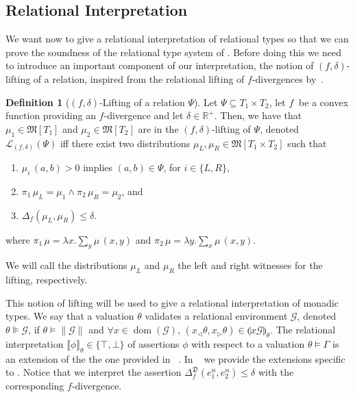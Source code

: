 \documentclass{sig-alternate-05-2015}
\theoremstyle{plain}
\theoremstyle{definition}
\newtheorem{definition}{Definition}[section]
\theoremstyle{corollary}
\def\lvmark{\triangleleft}
\def\rvmark{\triangleright}
\renewcommand{\l}[1]{#1_\lvmark}
\renewcommand{\r}[1]{#1_\rvmark}
\newcommand{\rrembed}[1]{\|{#1}\|}
\newcommand{\rmark}[1]{{#1}^{\Join}}
\newcommand{\renv}[1]{\mathcal{#1}}
\newcommand{\interp}[2]{\llbracket {#2} \rrbracket_{#1}}
\newcommand{\rinterp}[2]{\llparenthesis {#2} \rrparenthesis_{#1}}
\DeclareMathOperator{\dom}{dom}
\newcommand{\tmod}[1]{\mathfrak{M}[{#1}]}
\newcommand{\lift}[2]{\mathcal{L}_{#1}(#2)}
\def\R{\mathbb{R}}
\newcommand{\rplus}{\R^+}
\newcommand{\fdiv}{\ensuremath{f}}
\begin{document}
\subsection{Relational Interpretation}
We want now to give a relational interpretation of relational types so
that we can prove the soundness of the relational type system of \THESYSTEM.
Before doing this we need to introduce an important component of our interpretation, the notion of $(\fdiv,\delta)$-lifting of a relation, inspired from the relational lifting of \fdiv-divergences by~\citet{BartheO13}.


\begin{definition}[$(\fdiv,\delta)$-Lifting of a relation $\Psi$]
\label{def:lifting} Let $\Psi\subseteq T_1\times T_2$, let
  \fdiv$\ $ be a convex function providing an \fdiv-divergence and let 
  $\delta\in\rplus$. Then, we have that $\mu_1\in\tmod{T_1}$ and
  $\mu_2\in\tmod{T_2}$ are in the $(\fdiv, \delta)$-lifting of $\Psi$,
  denoted $\lift{(\fdiv, \delta)}{\Psi}$  iff there exist
  two distributions $\mu_L,\mu_R\in\tmod{T_1\times T_2}$ such that
  \begin{enumerate}
    \item $\mu_i\, (a,b) > 0$ implies $(a,b)\in \Psi$, for $i\in\{L,R\}$,
    \item $\pi_1\, \mu_L =\mu_1\land \pi_2\, \mu_R=\mu_2$, and
    \item $\Delta_{\fdiv}(\mu_L, \mu_R)\leq \delta$.
  \end{enumerate}
where $\pi_1\, \mu = \lambda x. \sum_{y} \mu\, (x,y)$ and $\pi_2\, \mu
= \lambda y. \sum_{x} \mu\, (x,y)$.

We will call the distributions $\mu_L$ and $\mu_R$ the left and right
witnesses for the lifting, respectively.
\end{definition}
This notion of lifting will be used to give a relational interpretation of  monadic types. We say that a valuation $\theta$ validates a relational environment  $\renv{G}$, denoted $\theta \VDash \renv{G}$, if $\theta \vDash
 \rrembed{\renv{G}}$ and $\forall x \in \dom(\renv{G})$,
 $(\l{x}\theta, \r{x}\theta) \in \rinterp{\theta}{x\renv{G}}$.
The relational interpretation $\interp{\theta}{\phi} \in \{ \top, \bot \}$ of 
assertions $\phi$ with respect to a valuation $\theta \vDash \Gamma$ is an extension of the
the one provided in ~\citet{BartheGAHRS15}. In ~ we provide the extensions specific to \THESYSTEM.
Notice that we interpret the assertion $\Delta_\fdiv^\mathfrak{D}(\rmark{e}_1, \rmark{e}_2)\leq \delta$ with the corresponding $\fdiv$-divergence.
\end{document}
